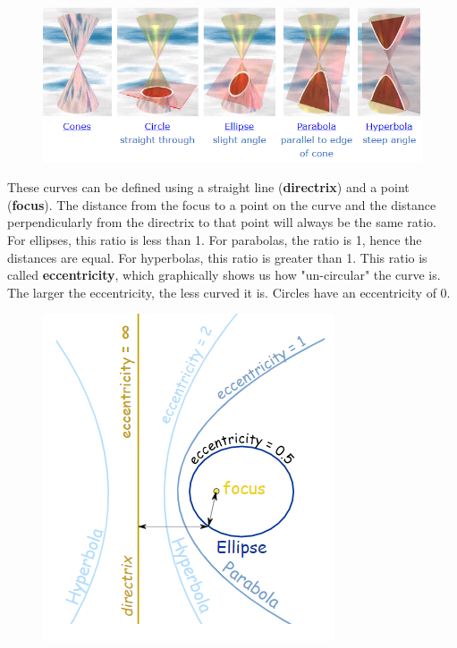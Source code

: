 \documentclass{article}
\begin{document}
    \begin{figure} [hbt!]
        \centering
        \includegraphics [scale=0.6] {Resources/Unit10Conics/conics.PNG}
    \end{figure}

    \noindent These curves can be defined using a straight line (\textbf{directrix}) and a
    point (\textbf{focus}). The distance from the focus to a point on the curve and the
    distance perpendicularly from the directrix to that point will always be the same ratio.
    For ellipses, this ratio is less than 1. For parabolas, the ratio is 1, hence the
    distances are equal. For hyperbolas, this ratio is greater than 1. This ratio is called
    \textbf{eccentricity}, which graphically shows us how "un-circular" the curve is. The
    larger the eccentricity, the less curved it is. Circles have an eccentricity of 0. \\

    \begin{figure} [hbt!]
        \centering
        \includegraphics [scale=0.5] {Resources/Unit10Conics/ecc.PNG}
    \end{figure}
\end{document}
